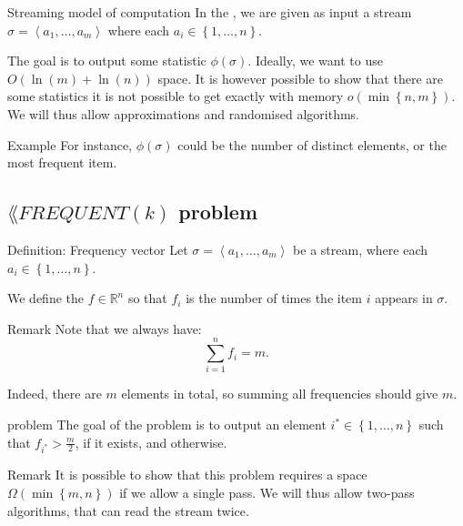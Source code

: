 \documentclass[a4paper]{article}
\begin{document}
\begin{parag}{Streaming model of computation}
    In the , we are given as input a stream $\sigma = \left\langle a_1, \ldots, a_m \right\rangle$ where each $a_i \in \left\{1, \ldots, n\right\}$.

    The goal is to output some statistic $\phi\left(\sigma\right)$. Ideally, we want to use $O\left(\ln\left(m\right) + \ln\left(n\right)\right)$ space. It is however possible to show that there are some statistics it is not possible to get exactly with memory $o\left(\min\left\{n, m\right\}\right)$. We will thus allow approximations and randomised algorithms.

    \begin{subparag}{Example}
        For instance, $\phi\left(\sigma\right)$ could be the number of distinct elements, or the most frequent item.
    \end{subparag}
\end{parag}

\subsection{$\lang{FREQUENT}\left(k\right)$ problem}

\begin{parag}{Definition: Frequency vector}
    Let $\sigma = \left\langle a_1, \ldots, a_m \right\rangle$ be a stream, where each $a_i \in \left\{1, \ldots, n\right\}$.

    We define the  $f \in \mathbb{R}^n$  so that $f_i$ is the number of times the item $i$ appears in $\sigma$.

    \begin{subparag}{Remark}
        Note that we always have: 
        \[\sum_{i=1}^{n} f_i = m.\]

        Indeed, there are $m$ elements in total, so summing all frequencies should give $m$.
    \end{subparag}
\end{parag}
 
\begin{parag}{ problem}
    The goal of the  problem is to output an element $i^* \in \left\{1, \ldots, n\right\}$ such that $f_{i^*} > \frac{m}{2}$, if it exists, and  otherwise.
    
    \begin{subparag}{Remark}
        It is possible to show that this problem requires a space $\Omega\left(\min\left\{m, n\right\}\right)$ if we allow a single pass. We will thus allow two-pass algorithms, that can read the stream twice.
    \end{subparag}
\end{parag}
\end{document}
